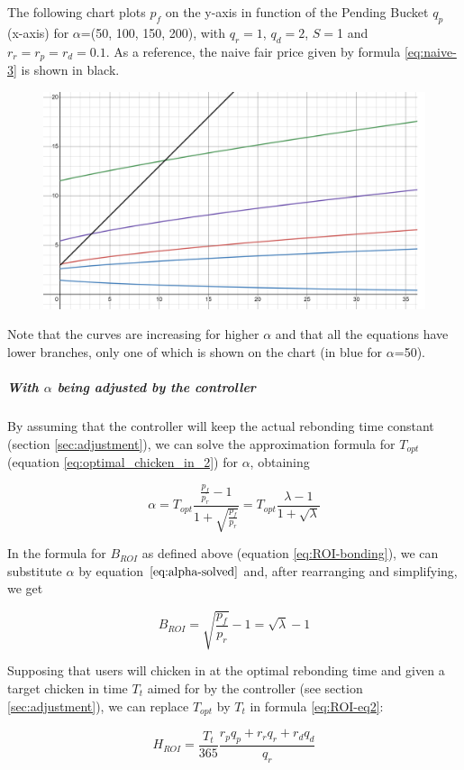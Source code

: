 \documentclass{article}
\begin{document}
The following chart plots $p_f$ on the y-axis in function of the Pending Bucket $q_p$ (x-axis) for $\alpha$=(50, 100, 150, 200), with $q_r=1$, $q_d=2$, $S=$1 and $r_r=r_p=r_d=0.1$. As a reference, the naive fair price given by formula \ref{eq:naive-3} is shown in black.

\begin{figure}[ht]
    \centering
    \includegraphics[width=0.5\linewidth]{./ChickenBonds_Whitepaper_comparison_price.png}
\end{figure}

Note that the curves are increasing for higher $\alpha$ and that all the equations have lower branches, only one of which is shown on the chart (in blue for $\alpha$=50). 

\subparagraph{With $\alpha$ being adjusted by the controller}
By assuming that the controller will keep the actual rebonding time constant (section \ref{sec:adjustment}), we can solve the approximation formula for $T_{opt}$ (equation \ref{eq:optimal_chicken_in_2}) for $\alpha$, obtaining

\begin{equation}
  \label{eq:alpha-solved}
  \alpha = T_{opt}\frac{\frac{p_f}{p_r} - 1}{1 + \sqrt{\frac{p_f}{p_r}}} = T_{opt}\frac{\lambda - 1}{1 + \sqrt{\lambda}}
\end{equation} 

In the formula for $B_{ROI}$ as defined above (equation \ref{eq:ROI-bonding}), we can substitute $\alpha$ by equation $\ref{eq:alpha-solved}$ and, after rearranging and simplifying, we get

\begin{equation}
  \label{eq:BROI-controller}
    B_{ROI} = \sqrt{\frac{p_f}{p_r}} - 1 = \sqrt{\lambda} - 1
\end{equation} 

Supposing that users will chicken in at the optimal rebonding time and given a target chicken in time $T_t$ aimed for by the controller (see section \ref{sec:adjustment}), we can replace $T_{opt}$ by $T_t$ in formula \ref{eq:ROI-eq2}:

\begin{equation}
  \label{eq:HROI-controller}
    H_{ROI} = \frac{T_t}{365} \frac{r_p q_p + r_r q_r + r_d q_d}{q_r}
\end{equation} 
\end{document}
